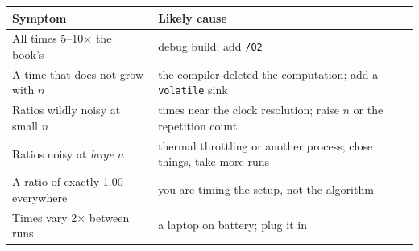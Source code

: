 \begin{alertbox}
\begin{longtable}{@{}L{5.6cm}L{8.9cm}@{}}
\toprule
{}
\textbf{Symptom} & \textbf{Likely cause} \\
\midrule
\endhead
All times 5--10$\times$ the book's & debug build; add \texttt{/O2} \\
A time that does not grow with $n$ & the compiler deleted the computation; add
  a \texttt{volatile} sink \\
Ratios wildly noisy at small $n$ & times near the clock resolution; raise $n$
  or the repetition count \\
Ratios noisy at \emph{large} $n$ & thermal throttling or another process; close
  things, take more runs \\
A ratio of exactly 1.00 everywhere & you are timing the setup, not the
  algorithm \\
Times vary 2$\times$ between runs & a laptop on battery; plug it in \\
\bottomrule
\end{longtable}
\end{alertbox}
